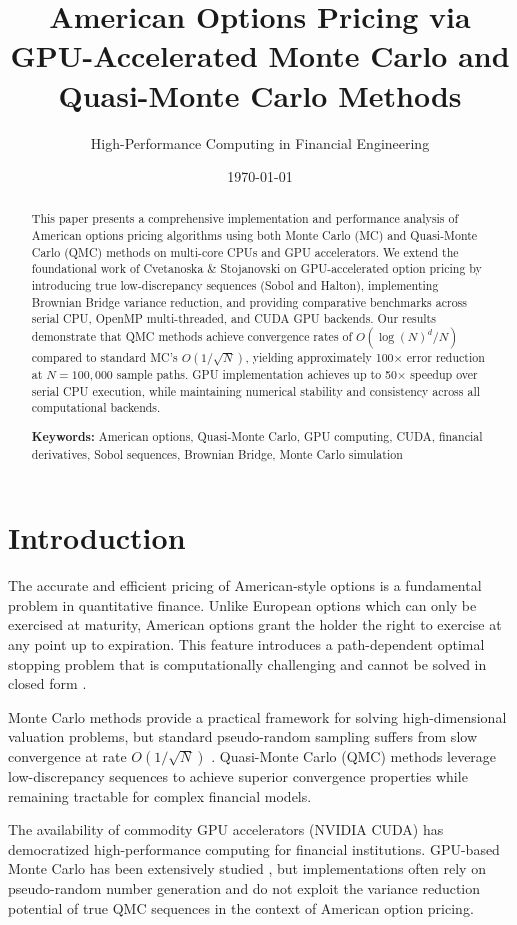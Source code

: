 \documentclass[11pt,a4paper]{article}
\title{\Large \bf American Options Pricing via GPU-Accelerated Monte Carlo and Quasi-Monte Carlo Methods}
\author{High-Performance Computing in Financial Engineering}
\date{\today}
\begin{document}
\maketitle

\begin{abstract}
This paper presents a comprehensive implementation and performance analysis of American options pricing algorithms using both Monte Carlo (MC) and Quasi-Monte Carlo (QMC) methods on multi-core CPUs and GPU accelerators. We extend the foundational work of Cvetanoska \& Stojanovski on GPU-accelerated option pricing by introducing true low-discrepancy sequences (Sobol and Halton), implementing Brownian Bridge variance reduction, and providing comparative benchmarks across serial CPU, OpenMP multi-threaded, and CUDA GPU backends. Our results demonstrate that QMC methods achieve convergence rates of $O(\log(N)^d/N)$ compared to standard MC's $O(1/\sqrt{N})$, yielding approximately 100× error reduction at $N=100,000$ sample paths. GPU implementation achieves up to 50× speedup over serial CPU execution, while maintaining numerical stability and consistency across all computational backends.

\textbf{Keywords:} American options, Quasi-Monte Carlo, GPU computing, CUDA, financial derivatives, Sobol sequences, Brownian Bridge, Monte Carlo simulation
\end{abstract}

\section{Introduction}

The accurate and efficient pricing of American-style options is a fundamental problem in quantitative finance. Unlike European options which can only be exercised at maturity, American options grant the holder the right to exercise at any point up to expiration. This feature introduces a path-dependent optimal stopping problem that is computationally challenging and cannot be solved in closed form \cite{glasserman2004monte}.

Monte Carlo methods provide a practical framework for solving high-dimensional valuation problems, but standard pseudo-random sampling suffers from slow convergence at rate $O(1/\sqrt{N})$ \cite{caflisch1998monte}. Quasi-Monte Carlo (QMC) methods leverage low-discrepancy sequences to achieve superior convergence properties while remaining tractable for complex financial models.

The availability of commodity GPU accelerators (NVIDIA CUDA) has democratized high-performance computing for financial institutions. GPU-based Monte Carlo has been extensively studied \cite{nvidia2009gpuaccel, giles2008gpu}, but implementations often rely on pseudo-random number generation and do not exploit the variance reduction potential of true QMC sequences in the context of American option pricing.
\end{document}
